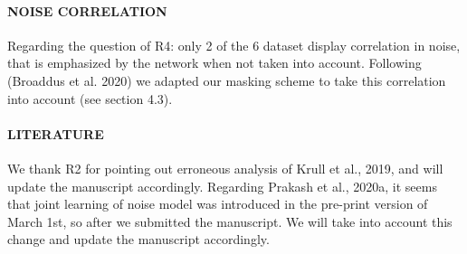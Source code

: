 \documentclass{article}
\begin{document}
\paragraph{NOISE CORRELATION}
Regarding the question of R4: only 2 of the 6 dataset display correlation in noise, that is emphasized by the network when not taken into account. Following (Broaddus et al. 2020) we adapted our masking scheme to take this correlation into account (see section 4.3).

\paragraph{LITERATURE}
We thank R2 for pointing out erroneous analysis of Krull et al., 2019, and will update the manuscript accordingly.
Regarding Prakash et al., 2020a, it seems that joint learning of noise model was introduced in the pre-print version of March 1st, so after we submitted the manuscript. We will take into account this change and update the manuscript accordingly.
\end{document}
